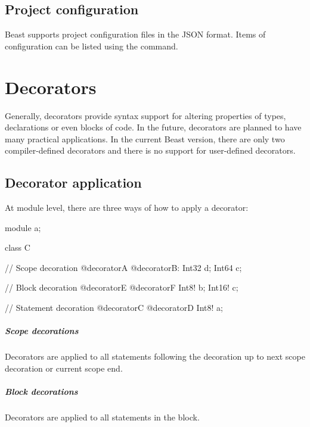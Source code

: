 \section{Project configuration}
Beast supports project configuration files in the JSON format. Items of configuration can be listed using the  command.

\chapter{Decorators}

\begin{grammar}
	  
\end{grammar}

Generally, decorators provide syntax support for altering properties of types, declarations or even blocks of code. In the future, decorators are planned to have many practical applications. In the current Beast version, there are only two compiler-defined decorators and there is no support for user-defined decorators.

\section{Decorator application}
At module level, there are three ways of how to apply a decorator:

\begin{code}
module a;

class C {
	
// Scope decoration
@decoratorA @decoratorB:
	Int32 d;
	Int64 c;
	
	// Block decoration
	@decoratorE @decoratorF {
		Int8! b;
		Int16! c;	
	}
	
	// Statement decoration
	@decoratorC @decoratorD Int8! a;
				
}
\end{code}

\paragraph{Scope decorations} Decorators are applied to all statements following the decoration up to next scope decoration or current scope end.

\paragraph{Block decorations} Decorators are applied to all statements in the block.

